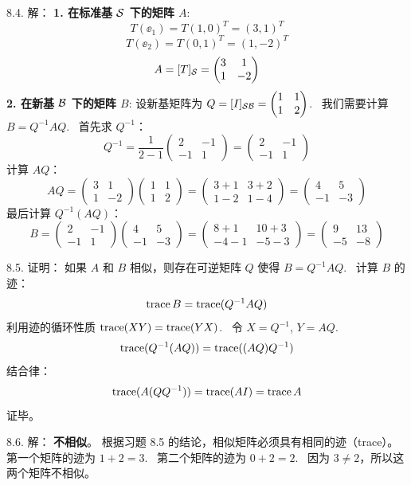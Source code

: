 \begin{exer}
8.4. 解：
\textbf{1. 在标准基 $\mathcal{S} $ 下的矩阵 $A$}:
$$ T(\ee_1) = T(1, 0)^T = (3, 1)^T $$
$$ T(\ee_2) = T(0, 1)^T = (1, -2)^T $$
$$ A = [T]_{\mathcal{S} } = \begin{pmatrix} 3 & 1 \\ 1 & -2 \end{pmatrix} $$
\textbf{2. 在新基 $\mathcal{B} $ 下的矩阵 $B$}:
设新基矩阵为 $Q = [I]_{\mathcal{S} \mathcal{B} } = \begin{pmatrix} 1 & 1 \\ 1 & 2 \end{pmatrix}$.~
我们需要计算 $B = Q^{-1} A Q$.~
首先求 $Q^{-1}$：
$$ Q^{-1} = \frac{1}{2-1} \begin{pmatrix} 2 & -1 \\ -1 & 1 \end{pmatrix} = \begin{pmatrix} 2 & -1 \\ -1 & 1 \end{pmatrix} $$
计算 $AQ$：
$$ AQ = \begin{pmatrix} 3 & 1 \\ 1 & -2 \end{pmatrix} \begin{pmatrix} 1 & 1 \\ 1 & 2 \end{pmatrix} = \begin{pmatrix} 3+1 & 3+2 \\ 1-2 & 1-4 \end{pmatrix} = \begin{pmatrix} 4 & 5 \\ -1 & -3 \end{pmatrix} $$
最后计算 $Q^{-1}(AQ)$：
$$ B = \begin{pmatrix} 2 & -1 \\ -1 & 1 \end{pmatrix} \begin{pmatrix} 4 & 5 \\ -1 & -3 \end{pmatrix} = \begin{pmatrix} 8+1 & 10+3 \\ -4-1 & -5-3 \end{pmatrix} = \begin{pmatrix} 9 & 13 \\ -5 & -8 \end{pmatrix} $$

8.5. 证明：
如果 $A$ 和 $B$ 相似，则存在可逆矩阵 $Q$ 使得 $B = Q^{-1} A Q$.~
计算 $B$ 的迹：
$$ \operatorname{trace} B = \operatorname{trace}(Q^{-1} A Q) $$
利用迹的循环性质 $\operatorname{trace}(XY) = \operatorname{trace}(YX)$.~
令 $X = Q^{-1}$, $Y = AQ$.~
$$ \operatorname{trace}(Q^{-1} (AQ)) = \operatorname{trace}((AQ) Q^{-1}) $$
结合律：
$$ \operatorname{trace}(A (Q Q^{-1})) = \operatorname{trace}(A I) = \operatorname{trace} A $$
证毕。

8.6. 解：
\textbf{不相似}。
根据习题 8.5 的结论，相似矩阵必须具有相同的迹（trace）。
第一个矩阵的迹为 $1 + 2 = 3$.~
第二个矩阵的迹为 $0 + 2 = 2$.~
因为 $3 \neq 2$，所以这两个矩阵不相似。


\vspace{5ex}


\end{exer}








